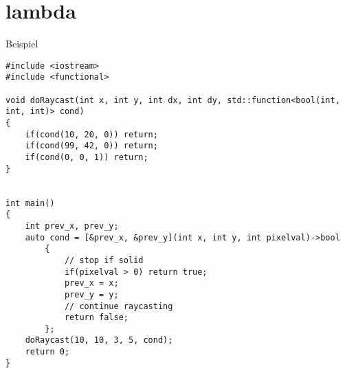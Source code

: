 \section{lambda}

\begin{frame}[fragile]{Beispiel}
	\begin{lstlisting}[basicstyle=\tiny]
#include <iostream>
#include <functional>

void doRaycast(int x, int y, int dx, int dy, std::function<bool(int, int, int)> cond)
{
    if(cond(10, 20, 0)) return;
    if(cond(99, 42, 0)) return;
    if(cond(0, 0, 1)) return;
}


int main()
{
    int prev_x, prev_y;
    auto cond = [&prev_x, &prev_y](int x, int y, int pixelval)->bool
        {
            // stop if solid
            if(pixelval > 0) return true;
            prev_x = x;
            prev_y = y;
            // continue raycasting
            return false;
        };
    doRaycast(10, 10, 3, 5, cond);
	return 0;
}
	\end{lstlisting}
\end{frame}
